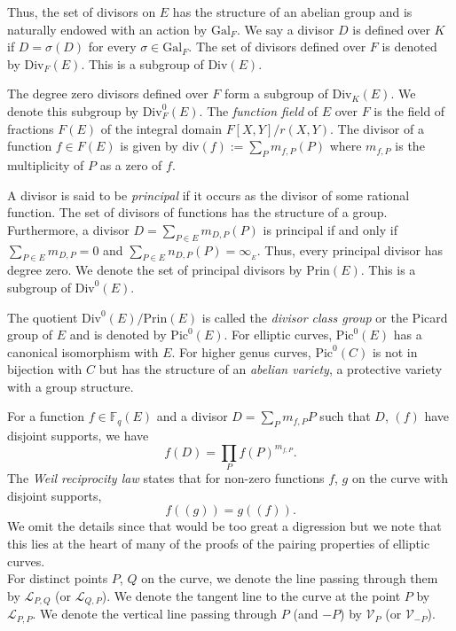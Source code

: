 \documentclass[11pt, lettersize, notitlepage, leqno, footskip=0.6cm]{article}
\newcommand{\bFq}{\mathbb{F}_q}
\newcommand{\pl}{\prod\limits}
\newcommand{\slim}{\sum\limits}
\newcommand{\absf}{\mathrm{Gal}_F}
\newcommand{\divv}{\mathrm{div}}
\newcommand{\mc}{\mathcal}
\newcommand{\mr}{\mathrm}
\newcommand{\vs}{\vspace{-2mm}}
\numberwithin{equation}{section}
\begin{document}
Thus, the set of divisors on $E$ has the structure of an abelian group and is naturally endowed with an action by $\absf$. We say a divisor $D$ is defined over $K$ if $D = \sigma(D)$ for every $\sigma\in \absf$. The set of divisors defined over $F$ is denoted by $\mr{Div}_F(E)$. This is a subgroup of $\mr{Div}(E)$.

The degree zero divisors defined over $F$ form a subgroup of $\mr{Div}_K(E)$. We denote this subgroup by $\mr{Div}_F^0(E)$. The \textit{function field} of $E$ over $F$ is the field of fractions $F(E)$ of the integral domain $F[X,Y]/r(X,Y).$ The divisor of a function $f\in F(E)$ is given by $\divv(f):= \slim_{P} m_{f,P}(P)$ where $m_{f,P}$ is the multiplicity of $P$ as a zero of $f$. 

A divisor is said to be \textit{principal} if it occurs as the divisor of some rational function. The set of divisors of functions has the structure of a group. Furthermore, a divisor $D= \slim_{P\in E}m_{D,P}(P)$ is principal if and only if $\slim_{P\in E}m_{D,P} = 0$ and $\slim_{P\in E}n_{D,P}(P) = \infty_{_E}$. Thus, every principal divisor has degree zero. We denote the set of principal divisors by $\mr{Prin}(E)$. This is a subgroup of $\mr{Div}^0(E)$.

The quotient $\mr{Div}^0(E)/\mr{Prin}(E)$ is called the \textit{divisor class group} or the Picard group of $E$ and is denoted by $\mr{Pic}^0(E)$. For elliptic curves,  $\mr{Pic}^0(E)$ has a canonical isomorphism with $E$. For higher genus curves, $\mr{Pic}^0(C)$ is not in bijection with $C$ but has the structure of an \textit{abelian variety}, a protective variety with a group structure.  


For a function $f\in \bFq(E)$ and a divisor $D= \slim_{P} m_{f,P}P$ such that $D$, $(f)$ have disjoint supports, we have \vs $$f(D) = \pl_{P} f(P)^{m_{f,P}} .$$ The \textit{Weil reciprocity law} states that for non-zero functions $f$, $g$ on the curve with disjoint supports, \vs $$f((g)) = g((f)) .$$ We omit the details since that would be too great a digression but we note that this lies at the heart of many of the proofs of the pairing properties of elliptic curves.\\

For distinct points $P$, $Q$ on the curve, we denote the line passing through them by $\mc{L}_{P,Q}$ (or $\mc{L}_{Q, P}$). We denote the tangent line to the curve at the point $P$ by $\mc{L}_{P, P}$. We denote the vertical line passing through $P$ (and $-P$) by $\mc{V}_P$ (or $\mc{V}_{-P}$). \\
\end{document}
